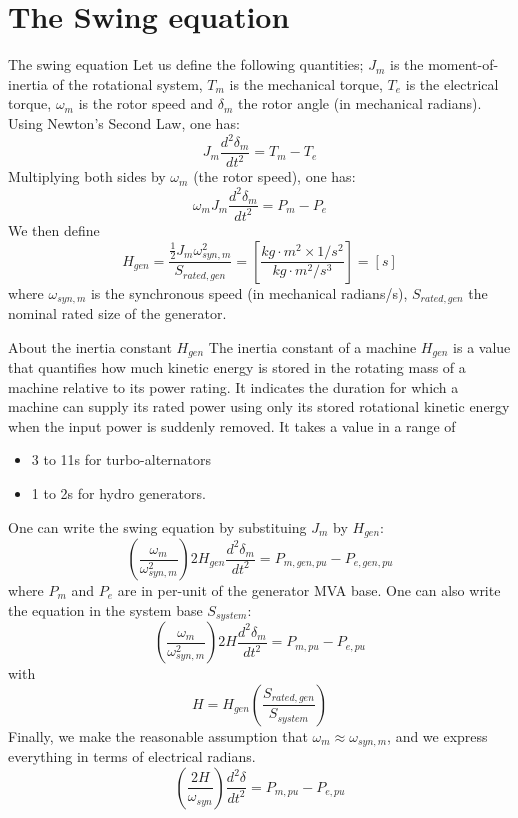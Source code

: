 \section{The Swing equation}
\begin{frame} [allowframebreaks]{The swing equation}
Let us define the following quantities; $J_m$ is the moment-of-inertia of the rotational system, $T_m$ is the mechanical torque, $T_e$ is the electrical torque, $\omega_m$ is the rotor speed and $\delta_m$ the rotor angle (in mechanical radians). Using Newton's Second Law, one has:
$$J_m\frac{d^2\delta_m}{dt^2} = T_m-T_e$$
Multiplying both sides by $\omega_m$ (the rotor speed), one has:
$$\omega_m J_m \frac{d^2\delta_m}{dt^2} = P_m-P_e$$
We then define
$$H_{gen} = \frac{\frac{1}{2}J_m \omega_{syn,m}^2}{S_{rated,gen}} = \left[\frac{kg \cdot m^2 \times 1/s^2}{kg \cdot m^2/s^3}\right] = \left[s\right]$$
where $\omega_{syn,m}$ is the synchronous speed (in mechanical radians/s), $S_{rated,gen}$ the nominal rated size of the generator.

\begin{block}{About the inertia constant $H_{gen}$}
The inertia constant of a machine $H_{gen}$ is a value that quantifies how much kinetic energy is stored in the rotating mass of a machine relative to its power rating. 
It indicates the duration for which a machine can supply its rated power using only its stored rotational kinetic energy when the input power is suddenly removed.
It takes a value in a range of 
\begin{itemize}
    \item 3 to 11s for turbo-alternators
    \item 1 to 2s  for hydro generators.
\end{itemize} 
\end{block}


One can write the swing equation by substituing $J_m$ by $H_{gen}$:
$$\left(\frac{\omega_m}{\omega_{syn,m}^2}\right)2 H_{gen} \frac{d^2\delta_m}{dt^2} = P_{m,gen,pu} - P_{e,gen,pu}$$
where $P_m$ and $P_e$ are in per-unit of the generator MVA base. One can also write the equation in the system base $S_{system}$:
$$\left(\frac{\omega_m}{\omega_{syn,m}^2}\right)2 H \frac{d^2\delta_m}{dt^2} = P_{m,pu} - P_{e,pu}$$
with
$$H = H_{gen} \left(\frac{S_{rated,gen}}{S_{system}}\right)$$
Finally, we make the reasonable assumption that $\omega_m \approx \omega_{syn,m}$, and we express everything in terms of electrical radians.
\begin{equation}
\left(\frac{2H}{\omega_{syn}}\right) \frac{d^2\delta}{dt^2} = P_{m,pu} - P_{e,pu} \label{eq:swing}
\end{equation}

\end{frame}

